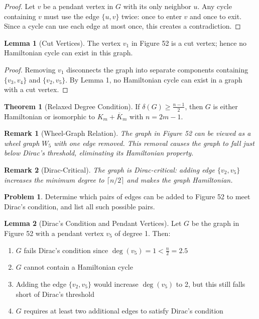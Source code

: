 \documentclass{article}
\newtheorem{remark}{Remark}
\theoremstyle{definition}
\newtheorem{problem}{Problem}
\newtheorem{theorem}{Theorem}
\newtheorem{lemma}{Lemma}
\begin{document}
\begin{proof}
Let $v$ be a pendant vertex in $G$ with its only neighbor $u$. Any cycle containing $v$ must use the edge $\{u,v\}$ twice: once to enter $v$ and once to exit. Since a cycle can use each edge at most once, this creates a contradiction.
\end{proof}

\begin{lemma}[Cut Vertices]
The vertex $v_1$ in Figure 52 is a cut vertex; hence no Hamiltonian cycle can exist in this graph.
\end{lemma}

\begin{proof}
Removing $v_1$ disconnects the graph into separate components containing $\{v_3,v_4\}$ and $\{v_2,v_5\}$. By Lemma 1, no Hamiltonian cycle can exist in a graph with a cut vertex.
\end{proof}

\begin{theorem}[Relaxed Degree Condition]
If $\delta(G) \geq \frac{n-1}{2}$, then $G$ is either Hamiltonian or isomorphic to $K_m + \overline{K}_m$ with $n = 2m-1$.
\end{theorem}

\begin{remark}[Wheel-Graph Relation]
The graph in Figure 52 can be viewed as a wheel graph $W_5$ with one edge removed. This removal causes the graph to fall just below Dirac's threshold, eliminating its Hamiltonian property.
\end{remark}

\begin{remark}[Dirac-Critical]
The graph is Dirac-critical: adding edge $\{v_2,v_5\}$ increases the minimum degree to $\lceil n/2 \rceil$ and makes the graph Hamiltonian.
\end{remark}

\begin{problem}
Determine which pairs of edges can be added to Figure 52 to meet Dirac's condition, and list all such possible pairs.
\end{problem}
\begin{lemma}[Dirac's Condition and Pendant Vertices]
Let $G$ be the graph in Figure 52 with a pendant vertex $v_5$ of degree 1. Then:
\begin{enumerate}
    \item $G$ fails Dirac's condition since $\deg(v_5) = 1 < \frac{n}{2} = 2.5$
    \item $G$ cannot contain a Hamiltonian cycle
    \item Adding the edge $\{v_2, v_5\}$ would increase $\deg(v_5)$ to 2, but this still falls short of Dirac's threshold
    \item $G$ requires at least two additional edges to satisfy Dirac's condition
\end{enumerate}
\end{lemma}
\end{document}
